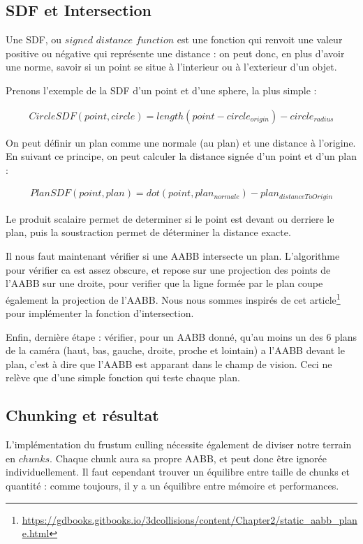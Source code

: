 \documentclass{EPUProjetDi}
\begin{document}
\subsection{SDF et Intersection}

Une SDF, ou $signed$ $distance$ $function$ est une fonction qui renvoit une valeur positive ou négative qui représente une distance : on peut donc, en plus d'avoir une norme, savoir si un point se situe à l'interieur ou à l'exterieur d'un objet.

Prenons l'exemple de la SDF d'un point et d'une sphere, la plus simple :

\begin{align*}
	CircleSDF(point, circle) = length(point - circle_{origin}) - circle_{radius}
\end{align*}

On peut définir un plan comme une normale (au plan) et une distance à l'origine.
En suivant ce principe, on peut calculer la distance signée d'un point et d'un plan :

\begin{align*}
	PlanSDF(point, plan) = dot(point, plan_{normale}) - plan_{distanceToOrigin}
\end{align*}

Le produit scalaire permet de determiner si le point est devant ou derriere le plan, puis la soustraction permet de déterminer la distance exacte.

Il nous faut maintenant vérifier si une AABB intersecte un plan.
L'algorithme pour vérifier ca est assez obscure, et repose sur une projection des points de l'AABB sur une droite, pour verifier que la ligne formée par le plan coupe également la projection de l'AABB. Nous nous sommes inspirés de cet article\footnote{\url{https://gdbooks.gitbooks.io/3dcollisions/content/Chapter2/static_aabb_plane.html}} pour implémenter la fonction d'intersection.

Enfin, dernière étape : vérifier, pour un AABB donné, qu'au moins un des 6 plans de la caméra (haut, bas, gauche, droite, proche et lointain) a l'AABB devant le plan, c'est à dire que l'AABB est apparant dans le champ de vision. Ceci ne relève que d'une simple fonction qui teste chaque plan.

\subsection{Chunking et résultat}

L'implémentation du frustum culling nécessite également de diviser notre terrain en $chunks$. Chaque chunk aura sa propre AABB, et peut donc être ignorée individuellement. Il faut cependant trouver un équilibre entre taille de chunks et quantité : comme toujours, il y a un équilibre entre mémoire et performances.
\end{document}
